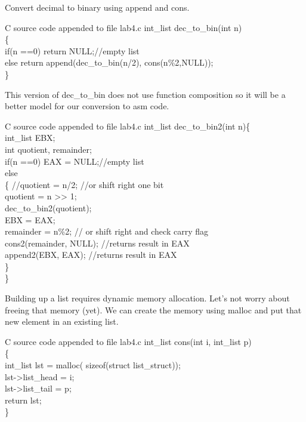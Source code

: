 \documentclass{article}
\begin{document}
\pagebreak
Convert decimal to binary using append and cons.
\begin{GFT}{C source code appended to file lab4.c}
\+int\_list dec\_to\_bin(int n)\\
\+\{\\
\+  if(n ==0) return NULL;//empty list\\
\+  else return append(dec\_to\_bin(n/2), cons(n\%2,NULL));\\
\+\}\\
\end{GFT}
This version of dec\_to\_bin does not use function composition so it will be a better model for our conversion to asm code.
\begin{GFT}{C source code appended to file lab4.c}
\+int\_list dec\_to\_bin2(int n)\{\\
\+  int\_list EBX;\\
\+  int quotient, remainder;\\
\+  if(n ==0) EAX = NULL;//empty list\\
\+  else \\
\+  \{ //quotient = n/2; //or shift right one bit\\
\+    quotient = n >> 1;\\
\+    dec\_to\_bin2(quotient);\\
\+    EBX = EAX;\\
\+    remainder = n\%2; // or shift right and check carry flag\\
\+    cons2(remainder, NULL); //returns result in EAX\\
\+    append2(EBX, EAX);     //returns result in EAX\\
\+  \}\\
\+\}\\
\end{GFT}
\pagebreak
Building up a list requires dynamic memory allocation. Let's not worry about freeing that memory (yet). We can create the memory using malloc and put that new element in an existing list.
\begin{GFT}{C source code appended to file lab4.c}
\+int\_list cons(int i, int\_list p)\\
\+\{\\
\+  int\_list lst = malloc( sizeof(struct list\_struct));\\
\+  lst->list\_head = i;\\
\+  lst->list\_tail = p;\\
\+  return lst;\\
\+\}\\
\end{GFT}
\end{document}
